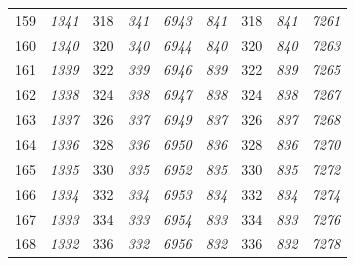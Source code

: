 \documentclass[10pt,fleqn]{article}
\begin{document}
\begin{longtable}{c|cccccccc}
159 & {\color{blue} \it 1341 \rm} & {\color{black} 318} & {\color{blue} \it 341 \rm} & {\color{blue} \it 6943 \rm} & {\color{blue} \it 841 \rm} & {\color{black} 318} & {\color{blue} \it 841 \rm} & {\color{blue} \it 7261 \rm} \\
160 & {\color{blue} \it 1340 \rm} & {\color{black} 320} & {\color{blue} \it 340 \rm} & {\color{blue} \it 6944 \rm} & {\color{blue} \it 840 \rm} & {\color{black} 320} & {\color{blue} \it 840 \rm} & {\color{blue} \it 7263 \rm} \\
161 & {\color{blue} \it 1339 \rm} & {\color{black} 322} & {\color{blue} \it 339 \rm} & {\color{blue} \it 6946 \rm} & {\color{blue} \it 839 \rm} & {\color{black} 322} & {\color{blue} \it 839 \rm} & {\color{blue} \it 7265 \rm} \\
162 & {\color{blue} \it 1338 \rm} & {\color{black} 324} & {\color{blue} \it 338 \rm} & {\color{blue} \it 6947 \rm} & {\color{blue} \it 838 \rm} & {\color{black} 324} & {\color{blue} \it 838 \rm} & {\color{blue} \it 7267 \rm} \\
163 & {\color{blue} \it 1337 \rm} & {\color{black} 326} & {\color{blue} \it 337 \rm} & {\color{blue} \it 6949 \rm} & {\color{blue} \it 837 \rm} & {\color{black} 326} & {\color{blue} \it 837 \rm} & {\color{blue} \it 7268 \rm} \\
164 & {\color{blue} \it 1336 \rm} & {\color{black} 328} & {\color{blue} \it 336 \rm} & {\color{blue} \it 6950 \rm} & {\color{blue} \it 836 \rm} & {\color{black} 328} & {\color{blue} \it 836 \rm} & {\color{blue} \it 7270 \rm} \\
165 & {\color{blue} \it 1335 \rm} & {\color{black} 330} & {\color{blue} \it 335 \rm} & {\color{blue} \it 6952 \rm} & {\color{blue} \it 835 \rm} & {\color{black} 330} & {\color{blue} \it 835 \rm} & {\color{blue} \it 7272 \rm} \\
166 & {\color{blue} \it 1334 \rm} & {\color{black} 332} & {\color{blue} \it 334 \rm} & {\color{blue} \it 6953 \rm} & {\color{blue} \it 834 \rm} & {\color{black} 332} & {\color{blue} \it 834 \rm} & {\color{blue} \it 7274 \rm} \\
167 & {\color{blue} \it 1333 \rm} & {\color{black} 334} & {\color{blue} \it 333 \rm} & {\color{blue} \it 6954 \rm} & {\color{blue} \it 833 \rm} & {\color{black} 334} & {\color{blue} \it 833 \rm} & {\color{blue} \it 7276 \rm} \\
168 & {\color{blue} \it 1332 \rm} & {\color{black} 336} & {\color{blue} \it 332 \rm} & {\color{blue} \it 6956 \rm} & {\color{blue} \it 832 \rm} & {\color{black} 336} & {\color{blue} \it 832 \rm} & {\color{blue} \it 7278 \rm} \\

\end{longtable}
\end{document}
